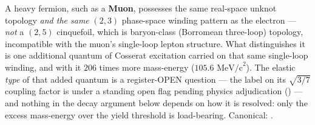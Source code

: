 A heavy fermion, such as a \textbf{Muon}, possesses the same real-space unknot topology \emph{and the same} $(2, 3)$ phase-space winding pattern as the electron --- \emph{not} a $(2, 5)$ cinquefoil, which is baryon-class (Borromean three-loop) topology, incompatible with the muon's single-loop lepton structure. What distinguishes it is one additional quantum of Cosserat excitation carried on that same single-loop winding, and with it $206$ times more mass-energy ($105.6 \text{ MeV/c}^2$). The elastic \emph{type} of that added quantum is a register-OPEN question --- the label on its $\sqrt{3/7}$ coupling factor is under a standing open flag pending physics adjudication () --- and nothing in the decay argument below depends on how it is resolved: only the excess mass-energy over the yield threshold is load-bearing. Canonical: .

